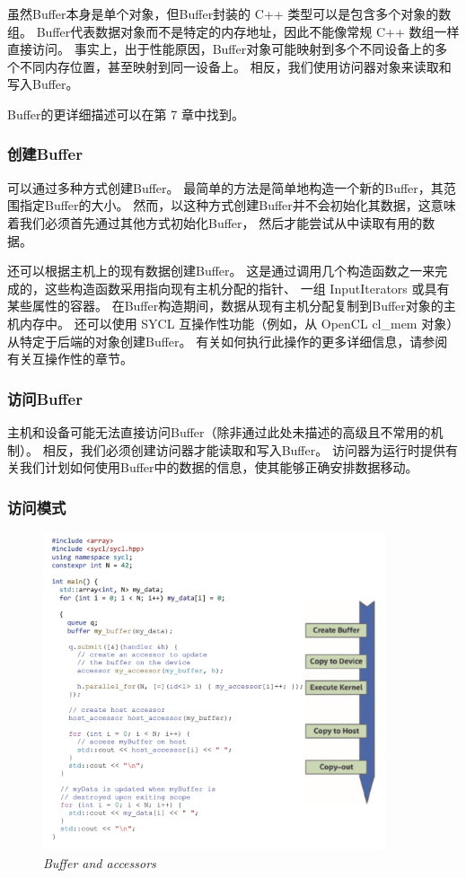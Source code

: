 虽然Buffer本身是单个对象，但Buffer封装的 C++ 类型可以是包含多个对象的数组。 
Buffer代表数据对象而不是特定的内存地址，因此不能像常规 C++ 数组一样直接访问。 
事实上，出于性能原因，Buffer对象可能映射到多个不同设备上的多个不同内存位置，甚至映射到同一设备上。 
相反，我们使用访问器对象来读取和写入Buffer。

Buffer的更详细描述可以在第 7 章中找到。

\subsubsection{创建Buffer}
可以通过多种方式创建Buffer。 最简单的方法是简单地构造一个新的Buffer，其范围指定Buffer的大小。 
然而，以这种方式创建Buffer并不会初始化其数据，这意味着我们必须首先通过其他方式初始化Buffer，
然后才能尝试从中读取有用的数据。

还可以根据主机上的现有数据创建Buffer。 
这是通过调用几个构造函数之一来完成的，这些构造函数采用指向现有主机分配的指针、
一组 InputIterators 或具有某些属性的容器。 在Buffer构造期间，数据从现有主机分配复制到Buffer对象的主机内存中。 
还可以使用 SYCL 互操作性功能（例如，从 OpenCL cl\_mem 对象）从特定于后端的对象创建Buffer。 
有关如何执行此操作的更多详细信息，请参阅有关互操作性的章节。

\subsubsection{访问Buffer}
主机和设备可能无法直接访问Buffer（除非通过此处未描述的高级且不常用的机制）。 
相反，我们必须创建访问器才能读取和写入Buffer。 
访问器为运行时提供有关我们计划如何使用Buffer中的数据的信息，使其能够正确安排数据移动。

\subsubsection{访问模式}
\begin{figure}[H]
	\centering
	\includegraphics[width=0.9\textwidth]{figs/F3.6.png}
	\caption{\textit{Buffer and accessors}}
\end{figure}

